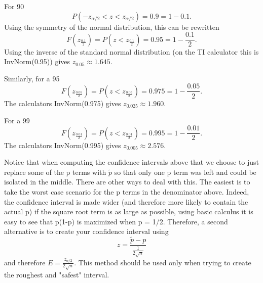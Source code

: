 \documentclass[10pt,]{book}
\theoremstyle{plain}
\theoremstyle{definition}
\theoremstyle{definition}
\theoremstyle{definition}
\numberwithin{equation}{section}
\newcommand{\lt}{ < }
\begin{document}
%
\par

For 90%
\begin{equation*}P( -z_{ \alpha/2} \lt z \lt z_{ \alpha/2}) = 0.9 = 1 - 0.1 .\end{equation*}
Using the symmetry of the normal distribution, this can be rewritten
\begin{equation*}F(z_{ \frac{0.1}{2}}) = P( z \lt z_{ \frac{0.1}{2}}) = 0.95 = 1 - \frac{0.1}{2} .\end{equation*}
Using the inverse of the standard normal distribution (on the TI calculator this is InvNorm(0.95)) gives \(z_{ 0.05} \approx 1.645\).
%
\par

Similarly, for a 95 %
\begin{equation*}F(z_{ \frac{0.05}{2}}) = P( z \lt z_{ \frac{0.05}{2}}) = 0.975 = 1 - \frac{0.05}{2} .\end{equation*}
The calculators InvNorm(0.975) gives \(z_{ 0.025} \approx 1.960\).
%
\par

For a 99 %
\begin{equation*}F(z_{ \frac{0.01}{2}}) = P( z \lt z_{ \frac{0.01}{2}}) = 0.995 = 1 - \frac{0.01}{2} .\end{equation*}
The calculators InvNorm(0.995) gives \(z_{ 0.005} \approx 2.576\).
%
\par

Notice that when computing the confidence intervals above that we choose to just replace some of the p terms with \(\tilde{p}\) so that only one p term was left and could be isolated in the middle. There are other ways to deal with this. The easiest is to take the worst case scenario for the p terms in the denominator above. Indeed, the confidence interval is made wider (and therefore more likely to contain the actual p) if the square root term is as large as possible, using basic calculus it is easy to see that p(1-p) is maximized when p = 1/2. Therefore, a second alternative is to create your confidence interval using
\begin{equation*}z = \frac{\tilde{p} - p}{\frac{1}{2\sqrt{n}}}\end{equation*}
and therefore \(E = \frac{z_{ \alpha/2}}{2\sqrt{n}}\).
This method should be used only when trying to create the roughest and "safest" interval.
%
\par
\end{document}

